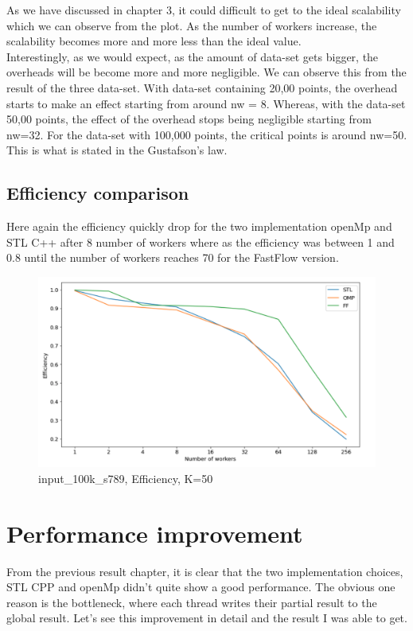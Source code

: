 \documentclass[12pt,a4paper]{report}
\begin{document}
 As we have discussed in chapter 3, it could difficult to get to the ideal scalability which we can observe from the plot. As the number of workers increase, the scalability becomes more and more less than the ideal value. \\
 
 Interestingly, as we would expect, as the amount of data-set gets bigger, the overheads will be become more and more negligible. We can observe this from the result of the three data-set. With data-set containing 20,00 points, the overhead starts to make an effect starting from around nw = 8. Whereas, with the data-set 50,00 points, the effect of the overhead stops being negligible starting from nw=32. For the data-set with 100,000 points, the critical points is around nw=50. This is what is stated in the Gustafson's law.
\section{Efficiency comparison}
Here again the efficiency quickly drop for the two implementation openMp and STL C++ after 8 number of workers where as the efficiency was between 1 and 0.8 until the number of workers reaches 70 for the FastFlow version.
\begin{figure}[H]
    \centering
    \includegraphics[width=\textwidth]{images/main-efficiency.png}
    \caption{input\_100k\_s789, Efficiency, K=50}
    \label{scalability-main}
\end{figure}

\chapter{Performance improvement}
From the previous result chapter, it is clear that the two implementation choices, STL CPP and openMp didn't quite show a good performance. The obvious one reason is the bottleneck, where each thread writes their partial result to the global result. Let's see this improvement in detail and the result I was able to get.
\end{document}
